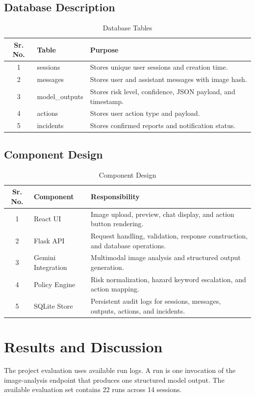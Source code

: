 \subsection{Database Description}
\begin{table}[H]
\centering
\caption{Database Tables}
\def\arraystretch{1.4}
\begin{tabularx}{\textwidth}{|c|X|X|}
\hline
\textbf{Sr. No.} & \textbf{Table} & \textbf{Purpose} \\ \hline
1 & sessions & Stores unique user sessions and creation time. \\ \hline
2 & messages & Stores user and assistant messages with image hash. \\ \hline
3 & model\_outputs & Stores risk level, confidence, JSON payload, and timestamp. \\ \hline
4 & actions & Stores user action type and payload. \\ \hline
5 & incidents & Stores confirmed reports and notification status. \\ \hline
\end{tabularx}
\end{table}

\subsection{Component Design}
\begin{table}[H]
\centering
\caption{Component Design}
\def\arraystretch{1.4}
\begin{tabularx}{\textwidth}{|c|X|X|}
\hline
\textbf{Sr. No.} & \textbf{Component} & \textbf{Responsibility} \\ \hline
1 & React UI & Image upload, preview, chat display, and action button rendering. \\ \hline
2 & Flask API & Request handling, validation, response construction, and database operations. \\ \hline
3 & Gemini Integration & Multimodal image analysis and structured output generation. \\ \hline
4 & Policy Engine & Risk normalization, hazard keyword escalation, and action mapping. \\ \hline
5 & SQLite Store & Persistent audit logs for sessions, messages, outputs, actions, and incidents. \\ \hline
\end{tabularx}
\end{table}

\section{Results and Discussion}
The project evaluation uses available run logs. A run is one invocation of the image-analysis endpoint that produces one structured model output. The available evaluation set contains 22 runs across 14 sessions.

